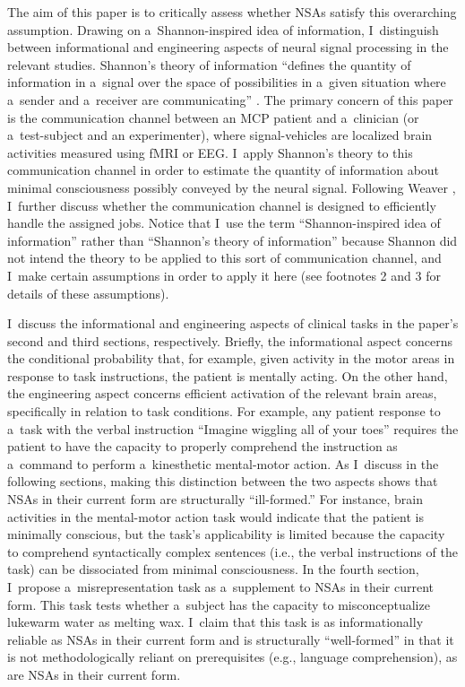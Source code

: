 The aim of this paper is to critically assess whether NSAs satisfy this overarching assumption. Drawing on a~Shannon-inspired idea of information, I~distinguish between informational and engineering aspects of neural signal processing in the relevant studies. Shannon's
\parencite*[][]{} %
 theory of information ``defines the quantity of information in a~signal over the space of possibilities in a~given situation where a~sender and a~receiver are communicating'' 
\parencite[][p.179]{noh_no-report_2018}. %
 The primary concern of this paper is the communication channel between an MCP patient and a~clinician (or a~test-subject and an experimenter), where signal-vehicles are localized brain activities measured using fMRI or EEG. I~apply Shannon's theory to this communication channel in order to estimate the quantity of information about minimal consciousness possibly conveyed by the neural signal. Following Weaver 
\parencite*[][p.270]{weaver_recent_1953}, %
 I~further discuss whether the communication channel is designed to efficiently handle the assigned jobs. Notice that I~use the term ``Shannon-inspired idea of information'' rather than ``Shannon's theory of information'' because Shannon did not intend the theory to be applied to this sort of communication channel, and I~make certain assumptions in order to apply it here (see footnotes 2 and 3 for details of these assumptions).

I~discuss the informational and engineering aspects of clinical tasks in the paper's second and third sections, respectively. Briefly, the informational aspect concerns the conditional probability that, for example, given activity in the motor areas in response to task instructions, the patient is mentally acting. On the other hand, the engineering aspect concerns efficient activation of the relevant brain areas, specifically in relation to task conditions. For example, any patient response to a~task with the verbal instruction ``Imagine wiggling all of your toes'' requires the patient to have the capacity to properly comprehend the instruction as a~command to perform a~kinesthetic mental-motor action. As I~discuss in the following sections, making this distinction between the two aspects shows that NSAs in their current form are structurally ``ill-formed.'' For instance, brain activities in the mental-motor action task would indicate that the patient is minimally conscious, but the task's applicability is limited because the capacity to comprehend syntactically complex sentences (i.e., the verbal instructions of the task) can be dissociated from minimal consciousness. In the fourth section, I~propose a~misrepresentation task as a~supplement to NSAs in their current form. This task tests whether a~subject has the capacity to misconceptualize lukewarm water as melting wax. I~claim that this task is as informationally reliable as NSAs in their current form and is structurally ``well-formed'' in that it is not methodologically reliant on prerequisites (e.g., language comprehension), as are NSAs in their current form.

